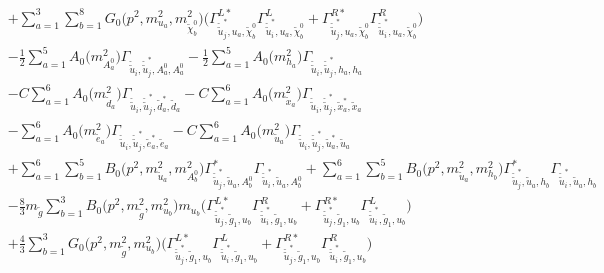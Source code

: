 \begin{itemize}
\begin{align}
 &+\sum_{a=1}^{3}\sum_{b=1}^{8}{G_0\Big(p^{2},m^2_{u_{{a}}},m^2_{\tilde{\chi}^0_{{b}}}\Big)} \Big({\Gamma^{L*}_{\check{\tilde{u}}^*_{{j}},u_{{a}},\tilde{\chi}^0_{{b}}}} {\Gamma^L_{\check{\tilde{u}}^*_{{i}},u_{{a}},\tilde{\chi}^0_{{b}}}}  + {\Gamma^{R*}_{\check{\tilde{u}}^*_{{j}},u_{{a}},\tilde{\chi}^0_{{b}}}} {\Gamma^R_{\check{\tilde{u}}^*_{{i}},u_{{a}},\tilde{\chi}^0_{{b}}}} \Big)\nonumber \\ 
 &-\frac{1}{2} \sum_{a=1}^{5}{A_0\Big(m^2_{A^0_{{a}}}\Big)} {\Gamma_{\check{\tilde{u}}_{{i}},\check{\tilde{u}}^*_{{j}},A^0_{{a}},A^0_{{a}}}}  -\frac{1}{2} \sum_{a=1}^{5}{A_0\Big(m^2_{h_{{a}}}\Big)} {\Gamma_{\check{\tilde{u}}_{{i}},\check{\tilde{u}}^*_{{j}},h_{{a}},h_{{a}}}}  \nonumber \\ 
 &- C \sum_{a=1}^{6}{A_0\Big(m^2_{\tilde{d}_{{a}}}\Big)} {\Gamma_{\check{\tilde{u}}_{{i}},\check{\tilde{u}}^*_{{j}},\tilde{d}^*_{{a}},\tilde{d}_{{a}}}}  - C \sum_{a=1}^{6}{A_0\Big(m^2_{\tilde{x}_{{a}}}\Big)} {\Gamma_{\check{\tilde{u}}_{{i}},\check{\tilde{u}}^*_{{j}},\tilde{x}^*_{{a}},\tilde{x}_{{a}}}}  \nonumber \\ 
 &- \sum_{a=1}^{6}{A_0\Big(m^2_{\tilde{e}_{{a}}}\Big)} {\Gamma_{\check{\tilde{u}}_{{i}},\check{\tilde{u}}^*_{{j}},\tilde{e}^*_{{a}},\tilde{e}_{{a}}}}  - C \sum_{a=1}^{6}{A_0\Big(m^2_{\tilde{u}_{{a}}}\Big)} {\Gamma_{\check{\tilde{u}}_{{i}},\check{\tilde{u}}^*_{{j}},\tilde{u}^*_{{a}},\tilde{u}_{{a}}}}  \nonumber \\ 
 &+\sum_{a=1}^{6}\sum_{b=1}^{5}{B_0\Big(p^{2},m^2_{\tilde{u}_{{a}}},m^2_{A^0_{{b}}}\Big)} {\Gamma^*_{\check{\tilde{u}}^*_{{j}},\tilde{u}_{{a}},A^0_{{b}}}} {\Gamma_{\check{\tilde{u}}^*_{{i}},\tilde{u}_{{a}},A^0_{{b}}}} +\sum_{a=1}^{6}\sum_{b=1}^{5}{B_0\Big(p^{2},m^2_{\tilde{u}_{{a}}},m^2_{h_{{b}}}\Big)} {\Gamma^*_{\check{\tilde{u}}^*_{{j}},\tilde{u}_{{a}},h_{{b}}}} {\Gamma_{\check{\tilde{u}}^*_{{i}},\tilde{u}_{{a}},h_{{b}}}} \nonumber \\ 
 &-\frac{8}{3} m_{\tilde{g}} \sum_{b=1}^{3}{B_0\Big(p^{2},m^2_{\tilde{g}},m^2_{u_{{b}}}\Big)} m_{u_{{b}}} \Big({\Gamma^{L*}_{\check{\tilde{u}}^*_{{j}},\tilde{g}_{{1}},u_{{b}}}} {\Gamma^R_{\check{\tilde{u}}^*_{{i}},\tilde{g}_{{1}},u_{{b}}}}  + {\Gamma^{R*}_{\check{\tilde{u}}^*_{{j}},\tilde{g}_{{1}},u_{{b}}}} {\Gamma^L_{\check{\tilde{u}}^*_{{i}},\tilde{g}_{{1}},u_{{b}}}} \Big) \nonumber \\ 
 &+\frac{4}{3} \sum_{b=1}^{3}{G_0\Big(p^{2},m^2_{\tilde{g}},m^2_{u_{{b}}}\Big)} \Big({\Gamma^{L*}_{\check{\tilde{u}}^*_{{j}},\tilde{g}_{{1}},u_{{b}}}} {\Gamma^L_{\check{\tilde{u}}^*_{{i}},\tilde{g}_{{1}},u_{{b}}}}  + {\Gamma^{R*}_{\check{\tilde{u}}^*_{{j}},\tilde{g}_{{1}},u_{{b}}}} {\Gamma^R_{\check{\tilde{u}}^*_{{i}},\tilde{g}_{{1}},u_{{b}}}} \Big) \nonumber \\ 

\end{align}
\end{itemize}
